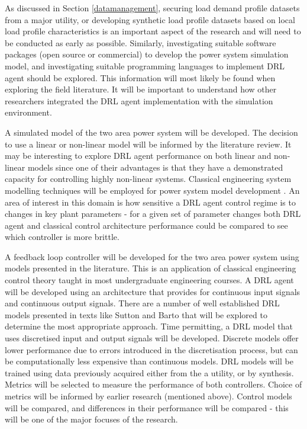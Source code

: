 As discussed in Section \ref{datamanagement}, securing load demand profile datasets from a major utility, or developing synthetic load profile datasets based on local load profile characteristics is an important aspect of the research and will need to be conducted as early as possible. Similarly, investigating suitable software packages (open source or commercial) to develop the power system simulation model, and investigating suitable programming languages to implement DRL agent should be explored. This information will most likely be found when exploring the field literature. It will be important to understand how other researchers integrated the DRL agent implementation with the simulation environment.

A simulated model of the two area power system will be developed. The decision to use a linear or non-linear model will be informed by the literature review. It may be interesting to explore DRL agent performance on both linear and non-linear models since one of their advantages is that they have a demonstrated capacity for controlling highly non-linear systems. Classical engineering system modelling techniques will be employed for power system model development \cite{Ogat2010}. An area of interest in this domain is how sensitive a DRL agent control regime is to changes in key plant parameters - for a given set of parameter changes both DRL agent and classical control architecture performance could be compared to see which controller is more brittle.

A feedback loop controller will be developed for the two area power system using models presented in the literature. This is an application of classical engineering control theory taught in most undergraduate engineering courses. A DRL agent will be developed using an architecture that provides for continuous input signals and continuous output signals. There are a number of well established DRL models presented in texts like Sutton and Barto that will be explored to determine the most appropriate approach. Time permitting, a DRL model that uses discretised input and output signals will be developed. Discrete models offer lower performance due to errors introduced in the discretisation process, but can be computationally less expensive than continuous models. DRL models will be trained using data previously acquired either from the a utility, or by synthesis. Metrics will be selected to measure the performance of both controllers. Choice of metrics will be informed by earlier research (mentioned above). Control models will be compared, and differences in their performance will be compared - this will be one of the major focuses of the research.

